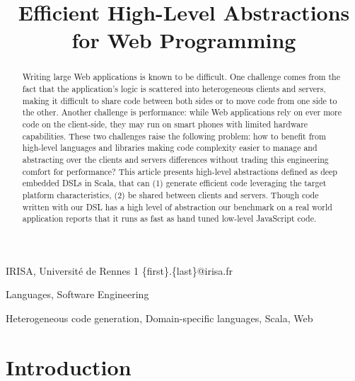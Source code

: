 \documentclass[preprint]{sigplanconf}
\begin{document}
\copyrightdata{[to be supplied]} 


\title{Efficient High-Level Abstractions for Web Programming}

           {IRISA, Université de Rennes 1}
           {\{first\}.\{last\}@irisa.fr}

\maketitle

\begin{abstract}


Writing large Web applications is known to be difficult. One challenge comes from the fact that the
application's logic is scattered into heterogeneous clients and servers, making it difficult to
share code between both sides or to move code from one side to the other. Another challenge is
performance: while Web applications rely on ever more code on the client-side, they may run on smart
phones with limited hardware capabilities. These two challenges raise the following problem: how to
benefit from high-level languages and libraries making code complexity easier to manage and
abstracting over the clients and servers differences without trading this engineering comfort for
performance? This article presents high-level abstractions defined as deep embedded DSLs in Scala,
that can (1) generate efficient code leveraging the target platform characteristics, (2) be shared
between clients and servers. Though code written with our DSL has a high level of abstraction our
benchmark on a real world application reports that it runs as fast as hand tuned low-level
JavaScript code.
\end{abstract}


\terms Languages, Software Engineering

\keywords Heterogeneous code generation, Domain-specific languages, Scala, Web

\section{Introduction}
\end{document}
